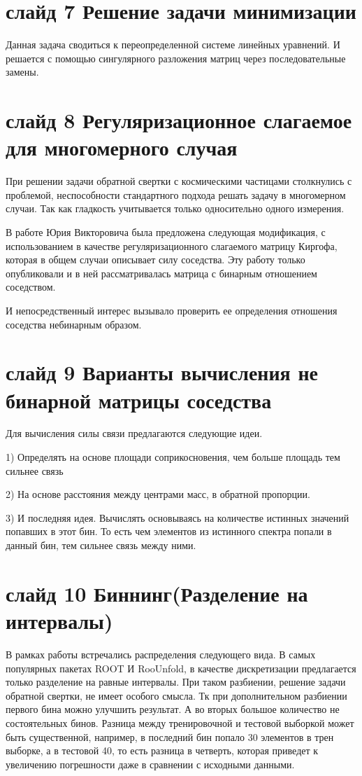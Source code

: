 \documentclass[a4paper,12pt]{diplom}
\begin{document}
\section*{слайд 7 Решение задачи минимизации}
Данная задача сводиться к переопределенной системе линейных уравнений. И решается с помощью сингулярного разложения матриц 
через последовательные замены.

\section*{слайд 8 Регуляризационное слагаемое для многомерного случая}
При решении задачи обратной свертки с космическими частицами столкнулись с проблемой, неспособности стандартного подхода решать задачу в многомерном 
случаи. Так как гладкость учитывается только односительно одного измерения.

В работе Юрия Викторовича была предложена следующая модификация, с использованием в качестве регуляризационного слагаемого матрицу Киргофа, 
которая в общем случаи описывает силу соседства. Эту работу только опубликовали и в ней рассматривалась матрица с бинарным отношением соседством.

И непосредственный интерес вызывало проверить ее определения отношения соседства небинарным образом.


\section*{слайд 9 Варианты вычисления не бинарной матрицы соседства}

Для вычисления силы связи предлагаются следующие идеи. 

1) Определять на основе площади соприкосновения, чем больше площадь тем сильнее связь 

2) На основе расстояния между центрами масс, в обратной пропорции.

3) И последняя идея. Вычислять основываясь на количестве истинных значений попавших в этот бин. То есть чем элементов из истинного спектра 
попали в данный бин, тем сильнее связь между ними.


\section*{слайд 10 Биннинг(Разделение на интервалы)}
В рамках работы встречались распределения следующего вида. В самых популярных пакетах ROOT И RooUnfold, в качестве дискретизации 
предлагается только разделение на равные интервалы. При таком разбиении, решение задачи обратной свертки, не имеет особого смысла. 
Тк при дополнительном разбиении первого бина можно улучшить результат. А во вторых большое количество не состоятельных бинов.  
Разница между тренировочной и тестовой выборкой может быть существенной, например, в последний бин попало 30 элементов в трен выборке,
а в тестовой 40, то есть разница в четверть, которая приведет к увеличению погрешности даже в сравнении с исходными данными.
\end{document}
